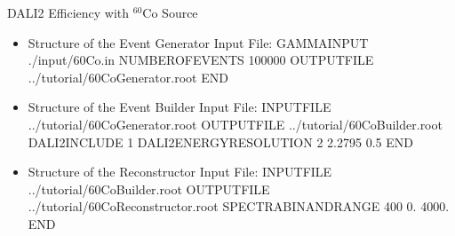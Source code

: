 \documentclass[
  style=pd,
  clock
]{powerdot}
\begin{document}
\begin{CJK}{UTF8}{min}
\begin{slide}{DALI2 Efficiency with $^{60}$Co Source}
  \begin{itemize} 
    \item Structure of the Event Generator Input File:\linebreak 
      {\ttfamily \small
        GAMMAINPUT ./input/60Co.in\linebreak
        NUMBEROFEVENTS 100000\linebreak
        OUTPUTFILE ../tutorial/60CoGenerator.root\linebreak
        END
      }
    \item Structure of the Event Builder Input File:\linebreak
      {\ttfamily \small
        INPUTFILE ../tutorial/60CoGenerator.root\linebreak
        OUTPUTFILE ../tutorial/60CoBuilder.root\linebreak
        DALI2INCLUDE 1\linebreak
        DALI2ENERGYRESOLUTION 2 2.2795 0.5\linebreak
        END
      }
    \item Structure of the Reconstructor Input File:\linebreak
      {\ttfamily \small
        INPUTFILE ../tutorial/60CoBuilder.root\linebreak
        OUTPUTFILE ../tutorial/60CoReconstructor.root\linebreak
        SPECTRABINANDRANGE 400 0. 4000.\linebreak
        END
      }
  \end{itemize}
\end{slide}



\end{CJK}
\end{document}
